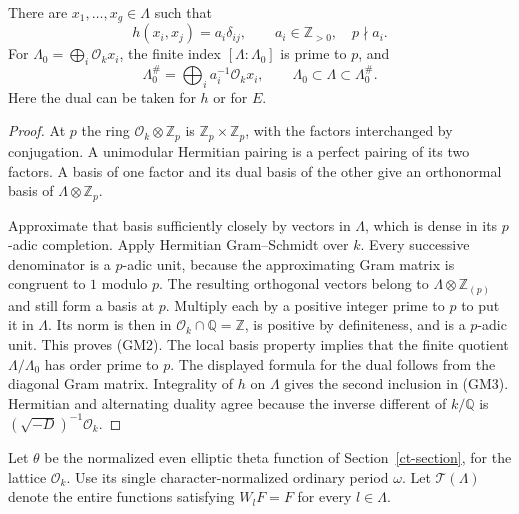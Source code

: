 \begin{lemma}\label{gm-orthogonal-frame}
There are $x_1,\ldots,x_g\in\Lambda$ such that
\[
 h(x_i,x_j)=a_i\delta_{ij},\qquad
 a_i\in\mathbb Z_{>0},\quad p\nmid a_i.                 \tag{GM2}
\]
For $\Lambda_0=\bigoplus_i\mathcal O_kx_i$,
the finite index $[\Lambda:\Lambda_0]$ is prime to $p$,
and
\[
 \Lambda_0^\#=\bigoplus_i a_i^{-1}\mathcal O_kx_i,
                  \qquad \Lambda_0\subset\Lambda\subset\Lambda_0^\#.
                                                               \tag{GM3}
\]
Here the dual can be taken for $h$ or for $E$.
\end{lemma}
\begin{proof}
At $p$ the ring $\mathcal O_k\otimes\mathbb Z_p$ is
$\mathbb Z_p\times\mathbb Z_p$, with the factors interchanged
by conjugation.  A unimodular Hermitian pairing is a perfect
pairing of its two factors.  A basis of one factor and its dual
basis of the other give an orthonormal basis of
$\Lambda\otimes\mathbb Z_p$.

Approximate that basis sufficiently closely by vectors in
$\Lambda$, which is dense in its $p$-adic completion.  Apply
Hermitian Gram--Schmidt over $k$.  Every successive denominator
is a $p$-adic unit, because the approximating Gram matrix is
congruent to $1$ modulo $p$.  The resulting orthogonal vectors
belong to $\Lambda\otimes\mathbb Z_{(p)}$ and still form a
basis at $p$.  Multiply each by a positive integer prime to $p$
to put it in $\Lambda$.  Its norm is then in
$\mathcal O_k\cap\mathbb Q=\mathbb Z$, is positive by
definiteness, and is a $p$-adic unit.  This proves (GM2).
The local basis property implies that the finite quotient
$\Lambda/\Lambda_0$ has order prime to $p$.
The displayed formula for the dual follows from the diagonal
Gram matrix.  Integrality of $h$ on $\Lambda$ gives the second
inclusion in (GM3).  Hermitian and alternating duality agree
because the inverse different of $k/\mathbb Q$ is
$(\sqrt{-D})^{-1}\mathcal O_k$.
\end{proof}

Let $\theta$ be the normalized even elliptic theta function of
Section~\ref{ct-section}, for the lattice $\mathcal O_k$.
Use its single character-normalized ordinary period $\omega$.
Let $\mathcal T(\Lambda)$ denote the entire functions satisfying
$W_lF=F$ for every $l\in\Lambda$.

